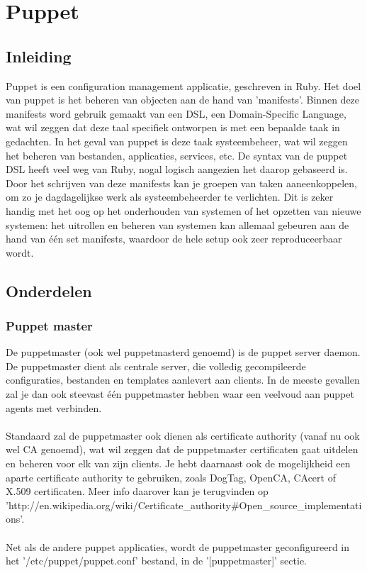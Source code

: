 \chapter{Puppet}

\section{Inleiding}
Puppet is een configuration management applicatie, geschreven in Ruby. Het doel van puppet is het beheren van objecten aan de hand van 'manifests'. Binnen deze manifests word gebruik gemaakt van een DSL, een Domain-Specific Language, wat wil zeggen dat deze taal specifiek ontworpen is met een bepaalde taak in gedachten. In het geval van puppet is deze taak systeembeheer, wat wil zeggen het beheren van bestanden, applicaties, services, etc. De syntax van de puppet DSL heeft veel weg van Ruby, nogal logisch aangezien het daarop gebaseerd is. Door het schrijven van deze manifests kan je groepen van taken aaneenkoppelen, om zo je dagdagelijkse werk als systeembeheerder te verlichten. Dit is zeker handig met het oog op het onderhouden van systemen of het opzetten van nieuwe systemen: het uitrollen en beheren van systemen kan allemaal gebeuren aan de hand van \'e\'en set manifests, waardoor de hele setup ook zeer reproduceerbaar wordt.

\section{Onderdelen}

\subsection{Puppet master}
De puppetmaster (ook wel puppetmasterd genoemd) is de puppet server daemon. De puppetmaster dient als centrale server, die volledig gecompileerde configuraties, bestanden en templates aanlevert aan clients. In de meeste gevallen zal je dan ook steevast \'e\'en puppetmaster hebben waar een veelvoud aan puppet agents met verbinden.\\\\
Standaard zal de puppetmaster ook dienen als certificate authority (vanaf nu ook wel CA genoemd), wat wil zeggen dat de puppetmaster certificaten gaat uitdelen en beheren voor elk van zijn clients. Je hebt daarnaast ook de mogelijkheid een aparte certificate authority te gebruiken, zoals DogTag, OpenCA, CAcert of X.509 certificaten. Meer info daarover kan je terugvinden op 'http://en.wikipedia.org/wiki/Certificate\_authority\#Open\_source\_implementations'.\\\\
Net als de andere puppet applicaties, wordt de puppetmaster geconfigureerd in het '/etc/puppet/puppet.conf' bestand, in de '[puppetmaster]' sectie.

